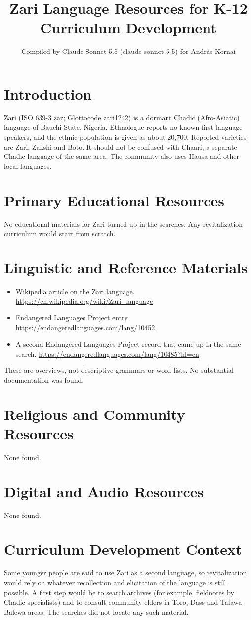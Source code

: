 \documentclass[12pt]{article}
\title{Zari Language Resources for K-12 Curriculum Development}
\author{Compiled by Claude Sonnet 5.5 (claude-sonnet-5-5) for Andr\'as Kornai}
\date{}
\begin{document}
\maketitle

\section{Introduction}
Zari (ISO 639-3 zaz; Glottocode zari1242) is a dormant Chadic (Afro-Asiatic) language of Bauchi State, Nigeria. Ethnologue reports no known first-language speakers, and the ethnic population is given as about 20,700. Reported varieties are Zari, Zakshi and Boto. It should not be confused with Chaari, a separate Chadic language of the same area. The community also uses Hausa and other local languages.

\section{Primary Educational Resources}
No educational materials for Zari turned up in the searches. Any revitalization curriculum would start from scratch.

\section{Linguistic and Reference Materials}
\begin{itemize}
\item Wikipedia article on the Zari language. \url{https://en.wikipedia.org/wiki/Zari_language}
\item Endangered Languages Project entry. \url{https://endangeredlanguages.com/lang/10452}
\item A second Endangered Languages Project record that came up in the same search. \url{https://endangeredlanguages.com/lang/10485?hl=en}
\end{itemize}
These are overviews, not descriptive grammars or word lists. No substantial documentation was found.

\section{Religious and Community Resources}
None found.

\section{Digital and Audio Resources}
None found.

\section{Curriculum Development Context}
Some younger people are said to use Zari as a second language, so revitalization would rely on whatever recollection and elicitation of the language is still possible. A first step would be to search archives (for example, fieldnotes by Chadic specialists) and to consult community elders in Toro, Dass and Tafawa Balewa areas. The searches did not locate any such material.
\end{document}
